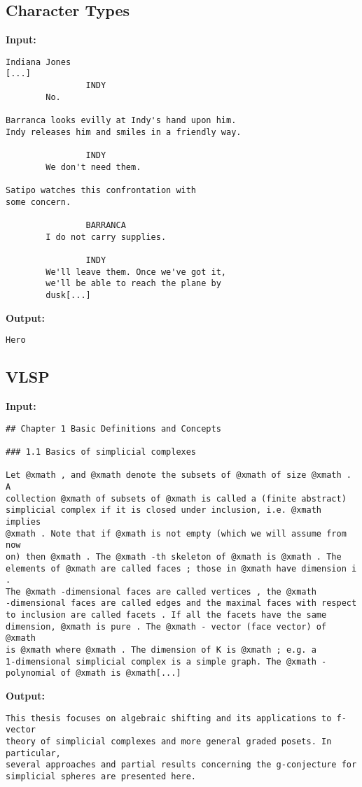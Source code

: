 \documentclass[10pt, a4paper]{article}
\begin{document}
\subsection*{Character Types}
\textbf{Input:}
\begin{lstlisting}
Indiana Jones
[...]
                INDY
        No.

Barranca looks evilly at Indy's hand upon him.
Indy releases him and smiles in a friendly way.

                INDY
        We don't need them.

Satipo watches this confrontation with 
some concern.

                BARRANCA
        I do not carry supplies.

                INDY
        We'll leave them. Once we've got it, 
        we'll be able to reach the plane by 
        dusk[...]
\end{lstlisting}
\textbf{Output:}
\begin{lstlisting}
Hero
\end{lstlisting}
\subsection*{VLSP}
\textbf{Input:}
\begin{lstlisting}
## Chapter 1 Basic Definitions and Concepts

### 1.1 Basics of simplicial complexes

Let @xmath , and @xmath denote the subsets of @xmath of size @xmath . A
collection @xmath of subsets of @xmath is called a (finite abstract)
simplicial complex if it is closed under inclusion, i.e. @xmath implies
@xmath . Note that if @xmath is not empty (which we will assume from now
on) then @xmath . The @xmath -th skeleton of @xmath is @xmath . The
elements of @xmath are called faces ; those in @xmath have dimension i .
The @xmath -dimensional faces are called vertices , the @xmath
-dimensional faces are called edges and the maximal faces with respect
to inclusion are called facets . If all the facets have the same
dimension, @xmath is pure . The @xmath - vector (face vector) of @xmath
is @xmath where @xmath . The dimension of K is @xmath ; e.g. a
1-dimensional simplicial complex is a simple graph. The @xmath -
polynomial of @xmath is @xmath[...]
\end{lstlisting}
\textbf{Output:}
\begin{lstlisting}
This thesis focuses on algebraic shifting and its applications to f-vector
theory of simplicial complexes and more general graded posets. In particular,
several approaches and partial results concerning the g-conjecture for
simplicial spheres are presented here.
\end{lstlisting}
\end{document}
